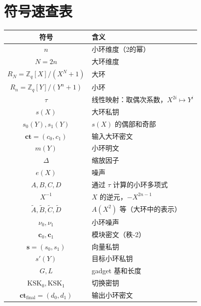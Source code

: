 \documentclass{article}
\begin{document}
\section{符号速查表}
\begin{center}
\begin{tabular}{|c|l|}
\hline
符号 & 含义 \\
\hline
$n$ & 小环维度（2的幂） \\
$N = 2n$ & 大环维度 \\
$R_N = \mathbb{Z}_q[X]/(X^N+1)$ & 大环 \\
$R_n = \mathbb{Z}_q[Y]/(Y^n+1)$ & 小环 \\
$\tau$ & 线性映射：取偶次系数，$X^{2i}\mapsto Y^i$ \\
$s(X)$ & 大环私钥 \\
$s_0(Y), s_1(Y)$ & $s(X)$ 的偶部和奇部 \\
$\mathbf{ct} = (c_0,c_1)$ & 输入大环密文 \\
$m(Y)$ & 小环明文 \\
$\Delta$ & 缩放因子 \\
$e(X)$ & 噪声 \\
$A,B,C,D$ & 通过 $\tau$ 计算的小环多项式 \\
$X^{-1}$ & $X$ 的逆元，$-X^{2n-1}$ \\
$\tilde{A},\tilde{B},\tilde{C},\tilde{D}$ & $A(X^2)$ 等（大环中的表示） \\
$\nu_0,\nu_1$ & 小环噪声 \\
$\mathbf{c}_0,\mathbf{c}_1$ & 模块密文（秩‑2） \\
$\mathbf{s} = (s_0,s_1)$ & 向量私钥 \\
$s'(Y)$ & 目标小环私钥 \\
$G, L$ & gadget 基和长度 \\
$\mathrm{KSK}_0,\mathrm{KSK}_1$ & 切换密钥 \\
$\mathbf{ct}_{\text{final}} = (d_0,d_1)$ & 输出小环密文 \\
\hline
\end{tabular}
\end{center}
\end{document}

